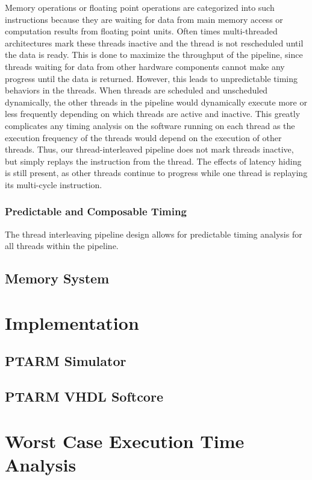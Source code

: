 Memory operations or floating point operations are categorized into such instructions because they are waiting for data from main memory access or computation results from floating point units.
Often times multi-threaded architectures mark these threads inactive and the thread is not rescheduled until the data is ready.
This is done to maximize the throughput of the pipeline, since threads waiting for data from other hardware components cannot make any progress until the data is returned. 
However, this leads to unpredictable timing behaviors in the threads.
When threads are scheduled and unscheduled dynamically, the other threads in the pipeline would dynamically execute more or less frequently depending on which threads are active and inactive.
This greatly complicates any timing analysis on the software running on each thread as the execution frequency of the threads would depend on the execution of other threads.
Thus, our thread-interleaved pipeline does not mark threads inactive, but simply replays the instruction from the thread.
The effects of latency hiding is still present, as other threads continue to progress while one thread is replaying its multi-cycle instruction.  

\subsubsection{Predictable and Composable Timing}
The thread interleaving pipeline design allows for predictable timing analysis for all threads within the pipeline.
 


\subsection{Memory System}
\label{subsection:memory_system}

\section{Implementation}
\subsection{PTARM Simulator}
\label{subsection:ptarm_sim}

\subsection{PTARM VHDL Softcore}
\label{subsectio:ptarm_vhdl_softcore}

\section{Worst Case Execution Time Analysis}
\label{sec:wcet}
